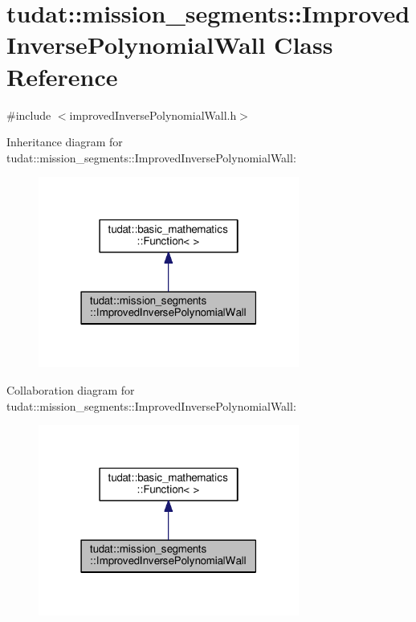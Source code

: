 \hypertarget{classtudat_1_1mission__segments_1_1ImprovedInversePolynomialWall}{}\section{tudat\+:\+:mission\+\_\+segments\+:\+:Improved\+Inverse\+Polynomial\+Wall Class Reference}
\label{classtudat_1_1mission__segments_1_1ImprovedInversePolynomialWall}


{\ttfamily \#include $<$improved\+Inverse\+Polynomial\+Wall.\+h$>$}



Inheritance diagram for tudat\+:\+:mission\+\_\+segments\+:\+:Improved\+Inverse\+Polynomial\+Wall\+:
\nopagebreak
\begin{figure}[H]
\begin{center}
\leavevmode
\includegraphics[width=243pt]{classtudat_1_1mission__segments_1_1ImprovedInversePolynomialWall__inherit__graph}
\end{center}
\end{figure}


Collaboration diagram for tudat\+:\+:mission\+\_\+segments\+:\+:Improved\+Inverse\+Polynomial\+Wall\+:
\nopagebreak
\begin{figure}[H]
\begin{center}
\leavevmode
\includegraphics[width=243pt]{classtudat_1_1mission__segments_1_1ImprovedInversePolynomialWall__coll__graph}
\end{center}
\end{figure}

